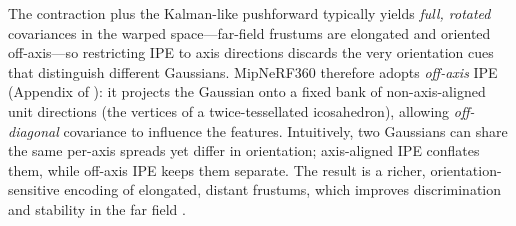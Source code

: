 \begin{enrichment}
\begin{enrichment}
        The contraction plus the Kalman-like pushforward typically yields \emph{full, rotated} covariances in the warped space—far-field frustums are elongated and oriented off-axis—so restricting IPE to axis directions discards the very orientation cues that distinguish different Gaussians. MipNeRF360 therefore adopts \emph{off-axis} IPE (Appendix of \cite{barron2022_mipnerf360}): it projects the Gaussian onto a fixed bank of non-axis-aligned unit directions (the vertices of a twice-tessellated icosahedron), allowing \emph{off-diagonal} covariance to influence the features. Intuitively, two Gaussians can share the same per-axis spreads yet differ in orientation; axis-aligned IPE conflates them, while off-axis IPE keeps them separate. The result is a richer, orientation-sensitive encoding of elongated, distant frustums, which improves discrimination and stability in the far field \cite{barron2022_mipnerf360}.
        

\end{enrichment}
\end{enrichment}
